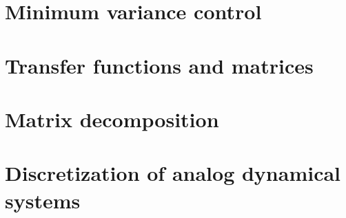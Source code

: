 \documentclass[12pt, a4paper]{report}
\begin{document}
    \chapter{Minimum variance control} 
    
    
    
    

    \appendix
    \chapter{Transfer functions and matrices}
    
    
    
    

    \chapter{Matrix decomposition}
    
    

    \chapter{Discretization of analog dynamical systems}
    
    
    
    
    
\end{document}
